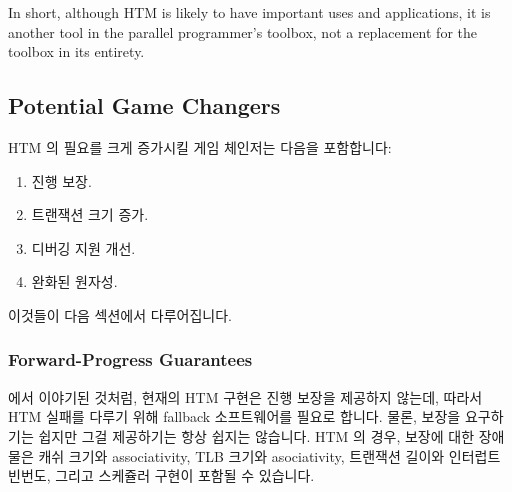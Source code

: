 In short, although HTM is likely to have important uses and applications,
it is another tool in the parallel programmer's toolbox, not a replacement
for the toolbox in its entirety.

\fi

\subsection{Potential Game Changers}
\label{sec:future:Potential Game Changers}

HTM 의 필요를 크게 증가시킬 게임 체인저는 다음을 포함합니다:

\begin{enumerate}
\item	진행 보장.
\item	트랜잭션 크기 증가.
\item	디버깅 지원 개선.
\item	완화된 원자성.
\end{enumerate}

이것들이 다음 섹션에서 다루어집니다.

\iffalse

Game changers that could greatly increase the need for HTM include
the following:

\begin{enumerate}
\item	Forward-progress guarantees.
\item	Transaction-size increases.
\item	Improved debugging support.
\item	Weak atomicity.
\end{enumerate}

These are expanded upon in the following sections.

\fi

\subsubsection{Forward-Progress Guarantees}
\label{sec:future:Forward-Progress Guarantees}

 에서 이야기된 것처럼,
현재의 HTM 구현은 진행 보장을 제공하지 않는데, 따라서 HTM 실패를 다루기 위해
fallback 소프트웨어를 필요로 합니다.
물론, 보장을 요구하기는 쉽지만 그걸 제공하기는 항상 쉽지는 않습니다.
HTM 의 경우, 보장에 대한 장애물은 캐쉬 크기와 associativity, TLB 크기와
asociativity, 트랜잭션 길이와 인터럽트 빈번도, 그리고 스케쥴러 구현이 포함될 수
있습니다.

